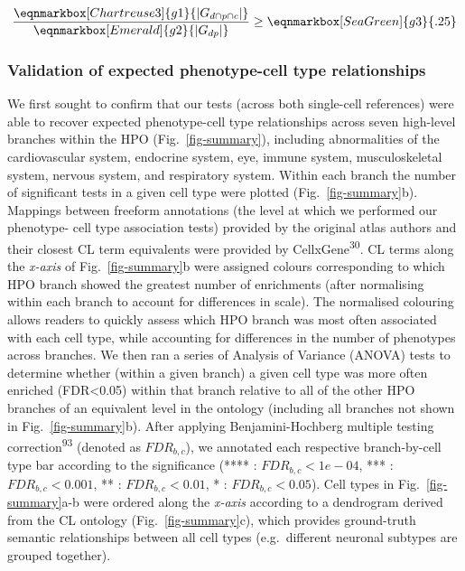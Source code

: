 \documentclass[
]{article}
\begin{document}
\hfill\break

\begin{equation*}
  \frac{
     \eqnmarkbox[Chartreuse3]{g1}{|G_{d \cap p \cap c} |}
    }{
       \eqnmarkbox[Emerald]{g2}{|G_{dp}|}} 
  \geq \eqnmarkbox[SeaGreen]{g3}{.25} 
\end{equation*}

\hfill\break
\hfill\break

\subsubsection{Validation of expected phenotype-cell type
relationships}\label{validation-of-expected-phenotype-cell-type-relationships-1}

We first sought to confirm that our tests (across both single-cell
references) were able to recover expected phenotype-cell type
relationships across seven high-level branches within the HPO
(Fig.~\ref{fig-summary}), including abnormalities of the cardiovascular
system, endocrine system, eye, immune system, musculoskeletal system,
nervous system, and respiratory system. Within each branch the number of
significant tests in a given cell type were plotted
(Fig.~\ref{fig-summary}b). Mappings between freeform annotations (the
level at which we performed our phenotype- cell type association tests)
provided by the original atlas authors and their closest CL term
equivalents were provided by CellxGene\textsuperscript{30}. CL terms
along the \emph{x-axis} of Fig.~\ref{fig-summary}b were assigned colours
corresponding to which HPO branch showed the greatest number of
enrichments (after normalising within each branch to account for
differences in scale). The normalised colouring allows readers to
quickly assess which HPO branch was most often associated with each cell
type, while accounting for differences in the number of phenotypes
across branches. We then ran a series of Analysis of Variance (ANOVA)
tests to determine whether (within a given branch) a given cell type was
more often enriched (FDR\textless0.05) within that branch relative to
all of the other HPO branches of an equivalent level in the ontology
(including all branches not shown in Fig.~\ref{fig-summary}b). After
applying Benjamini-Hochberg multiple testing
correction\textsuperscript{93} (denoted as \(FDR _{b,c}\)), we annotated
each respective branch-by-cell type bar according to the significance
(**** : \(FDR _{b,c}<1e-04\), *** : \(FDR _{b,c}<0.001\), ** :
\(FDR _{b,c}<0.01\), * : \(FDR _{b,c}<0.05\)). Cell types in
Fig.~\ref{fig-summary}a-b were ordered along the \emph{x-axis} according
to a dendrogram derived from the CL ontology (Fig.~\ref{fig-summary}c),
which provides ground-truth semantic relationships between all cell
types (e.g.~different neuronal subtypes are grouped together).
\end{document}
